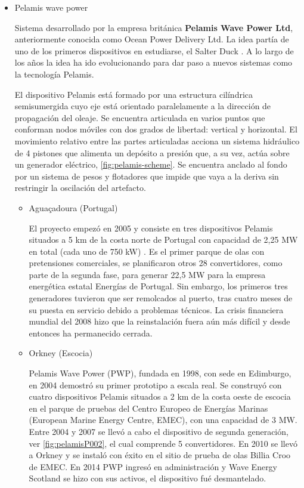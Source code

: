 \begin{itemize}
\item
  Pelamis wave power

  Sistema desarrollado por la empresa británica \textbf{Pelamis Wave
  Power Ltd}, anteriormente conocida como Ocean Power Delivery Ltd. La
  idea partía de uno de los primeros dispositivos en estudiarse, el
  Salter Duck \cite{duck74}. A lo largo de los años la idea ha ido
  evolucionando para dar paso a nuevos sistemas como la tecnología
  Pelamis.

  El dispositivo Pelamis está formado por una estructura cilíndrica
  semisumergida cuyo eje está orientado paralelamente a la dirección de
  propagación del oleaje. Se encuentra articulada en varios puntos que
  conforman nodos móviles con dos grados de libertad: vertical y
  horizontal. El movimiento relativo entre las partes articuladas
  acciona un sistema hidráulico de 4 pistones que alimenta un depósito a
  presión que, a su vez, actúa sobre un generador eléctrico, \autoref{fig:pelamis-scheme}. Se
  encuentra anclado al fondo por un sistema de pesos y flotadores que
  impide que vaya a la deriva sin restringir la oscilación del
  artefacto.



  \begin{itemize}
  \item
    Aguaçadoura (Portugal)

    El proyecto empezó en 2005 y consiste en tres dispositivos Pelamis
    situados a 5 km de la costa norte de Portugal con capacidad de 2,25
    MW en total (cada uno de 750 kW) \cite{pelamis06}. Es el primer parque de olas con
    pretensiones comerciales, se planificaron otros 28 convertidores,
    como parte de la segunda fase, para generar 22,5 MW para la empresa
    energética estatal Energías de Portugal. Sin embargo, los primeros
    tres generadores tuvieron que ser remolcados al puerto, tras cuatro
    meses de su puesta en servicio debido a problemas técnicos. La
    crisis financiera mundial del 2008 hizo que la reinstalación fuera
    aún más difícil y desde entonces ha permanecido cerrada.

   
  \item
    Orkney (Escocia)

    Pelamis Wave Power (PWP), fundada en 1998, con sede en Edimburgo, en
    2004 demostró su primer prototipo a escala real. Se construyó con
    cuatro dispositivos Pelamis situados a 2 km de la costa oeste de
    escocia en el parque de pruebas del Centro Europeo de Energías
    Marinas (European Marine Energy Centre, EMEC), con una capacidad de
    3 MW. Entre 2004 y 2007 se llevó a cabo el dispositivo de segunda
    generación, ver \autoref{fig:pelamisP002}, el cual comprende 5 convertidores. En 2010 se llevó a
    Orkney y se instaló con éxito en el sitio de prueba de olas Billia
    Croo de EMEC. En 2014 PWP ingresó en administración y Wave Energy
    Scotland se hizo con sus activos, el dispositivo fué desmantelado.


\end{itemize}
\end{itemize}
